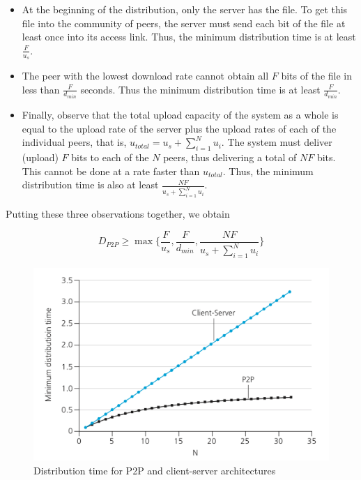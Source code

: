 \documentclass[11pt]{article}
\begin{document}
\begin{itemize}
	\item 
	
	At the beginning of the distribution, only the server has the file. To get this file into the community of peers, the server must send each bit of the file at least once into its access link. Thus, the minimum distribution time is at least $\frac{F}{u_s}$.
	
	\item
	
	The peer with the lowest download rate cannot obtain all $F$ bits of the file in less than $\frac{F}{d_{min}}$ seconds. Thus the minimum distribution time is at least $\frac{F}{d_{min}}$.
	
	\item
	
	Finally, observe that the total upload capacity of the system as a whole is equal to the upload rate of the server plus the upload rates of each of the individual peers, that is, $u_{total} = u_s + \sum_{i=1}^N u_i$. The system must deliver (upload) $F$ bits to each of the $N$ peers, thus delivering a total of $NF$ bits. This cannot be done at a rate faster than $u_{total}$. Thus, the minimum distribution time is also at least $\frac{NF}{u_s + \sum_{i=1}^N u_i}$.
	
\end{itemize}

Putting these three observations together, we obtain

\[
	D_{P2P} \ge \max \{\frac{F}{u_s}, \frac{F}{d_{min}}, \frac{NF}{u_s + \sum_{i=1}^N u_i} \}
\]

\begin{figure}[h]
	\centering
	\includegraphics[width=0.8\linewidth]{images/DistributionTime.png}
	\caption{Distribution time for P2P and client-server architectures}
	\label{fig:DistributionTime}
\end{figure}
\end{document}
